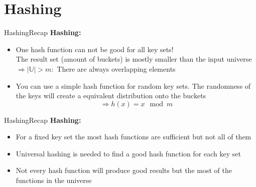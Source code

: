 \section{Hashing}


\begin{frame}{Hashing}{Recap}
  \textbf{Hashing:}
  \begin{itemize}
    \item
      One hash function can not be good for all key sets!\\
      The result set (amount of buckets) is mostly smaller than the input
      universe\\
      $\Rightarrow \vert \mathbb{U} \vert > m:$
      There are always overlapping elements
    \item
      You can use a simple hash function for random key sets.
      The randomness of the keys will create a equivalent distribution onto
      the buckets
      \[\Rightarrow h(x) = x \mod m\]
  \end{itemize}
\end{frame}


\begin{frame}{Hashing}{Recap}
  \textbf{Hashing:}
  \begin{itemize}
    \item
      For a fixed key set the most hash functions are sufficient but not all of
      them
    \item
      Universal hashing is needed to find a good hash function for each key set
    \item
      Not every hash function will produce good results but the most of the
      functions in the universe
  \end{itemize}
\end{frame}


